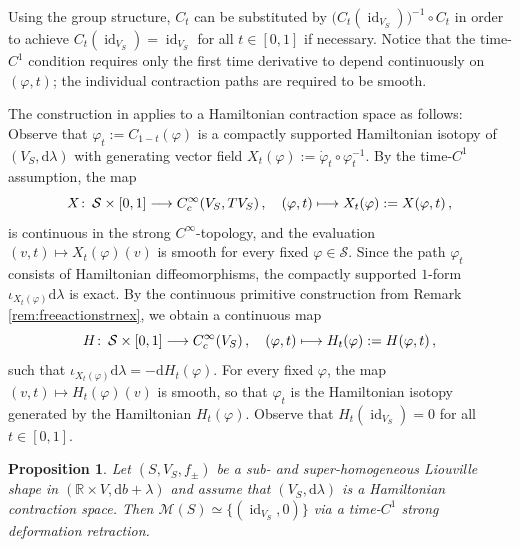 \documentclass{amsart}
\newtheorem{prop}{Proposition}[subsection]
\theoremstyle{definition}
\def\co{\colon\thinspace}
\newcommand{\rmd}{\mathrm d}
\newcommand{\MM}{\mathcal M}
\newcommand{\R}{\mathbb R}
\renewcommand{\SS}{\mathcal S}
\newcommand{\lra}{\longrightarrow}
\DeclareMathOperator{\id}{\mathrm{id}}
\begin{document}
Using the group structure,
$C_t$ can be substituted by
$\big(C_t(\id_{V_S})\big)^{-1}\circ C_t$
in order to achieve
$C_t(\id_{V_S})=\id_{V_S}$ for all $t\in[0,1]$
if necessary.
Notice that the time-$C^1$ condition requires only
the first time derivative to depend continuously
on $(\varphi,t)$;
the individual contraction paths are required to be smooth.

The construction in \cite[p.~417]{agz22}
applies to a Hamiltonian contraction space as follows:
Observe that
$\varphi_t:=C_{1-t}(\varphi)$ is a compactly supported
Hamiltonian isotopy of $(V_S,\rmd\lambda)$
with generating vector field
$X_t(\varphi):=\dot\varphi_t\circ\varphi_t^{-1}$.
By the time-$C^1$ assumption, the map
	 \[
	 X\co\SS\times[0,1]\lra C_c^{\infty}(V_S,TV_S)
	 \,,\quad
	 (\varphi,t)\longmapsto
	 X_t(\varphi):=X(\varphi,t)
	 \,,
	 \]
is continuous in the strong $C^{\infty}$-topology,
and the evaluation
$(v,t)\mapsto X_t(\varphi)(v)$ is smooth
for every fixed $\varphi\in\SS$.
Since the path $\varphi_t$ consists of
Hamiltonian diffeomorphisms,
the compactly supported $1$-form
$\iota_{X_t(\varphi)}\rmd\lambda$
is exact.
By the continuous primitive construction from
Remark \ref{rem:freeactionstrnex},
we obtain a continuous map
	\[
	H\co\SS\times[0,1]\lra C_c^{\infty}(V_S)
	\,,\quad
	(\varphi,t)\longmapsto
	H_t(\varphi):=H(\varphi,t)
	\,,
	\]
such that
$\iota_{X_t(\varphi)}\rmd\lambda=-\rmd H_t(\varphi)$.
For every fixed $\varphi$, the map
$(v,t)\mapsto H_t(\varphi)(v)$ is smooth,
so that $\varphi_t$ is the Hamiltonian isotopy
generated by the Hamiltonian $H_t(\varphi)$.
Observe that
$H_t(\id_{V_S})=0$ for all $t\in[0,1]$.


\begin{prop}
\label{prop:mscontractible}
Let $(S,V_S,f_{\pm})$ be a sub- and super-homogeneous
Liouville shape in $(\R\times V,\rmd b+\lambda)$
and assume that $(V_S,\rmd\lambda)$
is a Hamiltonian contraction space.
Then $\MM(S)\simeq\{(\id_{V_S},0)\}$
via a time-$C^1$ strong deformation retraction.
\end{prop}
\end{document}
